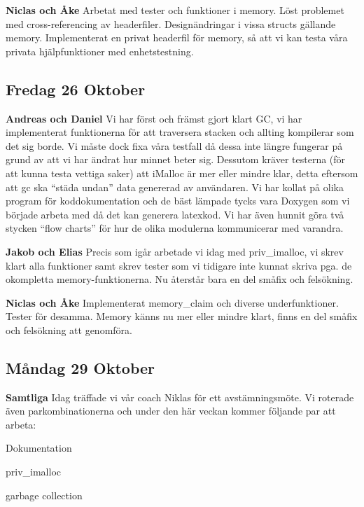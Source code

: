 \documentclass{article}
\begin{document}
{\bf Niclas och Åke} Arbetat med tester och funktioner i memory. Löst problemet med cross-referencing av headerfiler. Designändringar i vissa structs gällande memory. Implementerat en privat headerfil för memory, så att vi kan testa våra privata hjälpfunktioner med enhetstestning.

\subsection{Fredag 26 Oktober}

{\bf Andreas och Daniel} Vi har först och främst gjort klart GC, vi har implementerat funktionerna för att traversera stacken och allting kompilerar som det sig borde. Vi måste dock fixa våra testfall då dessa inte längre fungerar på grund av att vi har ändrat hur minnet beter sig. Dessutom kräver testerna (för att kunna testa vettiga saker) att iMalloc är mer eller mindre klar, detta eftersom att gc ska “städa undan” data genererad av användaren. Vi har kollat på olika program för koddokumentation och de bäst lämpade tycks vara Doxygen som vi började arbeta med då det kan generera latexkod. Vi har även hunnit göra två stycken “flow charts” för hur de olika modulerna kommunicerar med varandra.

{\bf Jakob och Elias} Precis som igår arbetade vi idag med priv\_imalloc, vi skrev klart alla funktioner samt skrev tester som vi tidigare inte kunnat skriva pga. de okompletta memory-funktionerna. Nu återstår bara en del småfix och felsökning.

{\bf Niclas och Åke} Implementerat memory\_claim och diverse underfunktioner. Tester för desamma. Memory känns nu mer eller mindre klart, finns en del småfix och felsökning att genomföra.

\subsection{Måndag 29 Oktober}
{\bf Samtliga} Idag träffade vi vår coach Niklas för ett avstämningsmöte. Vi roterade även parkombinationerna och under den här veckan kommer följande par att arbeta:

\begin{description} \parskip0pt
  \item[Andreas och Niclas] Dokumentation
  \item[Jakob och Åke] priv\_imalloc
  \item[Daniel och Elias] garbage collection
\end{description}
\end{document}
